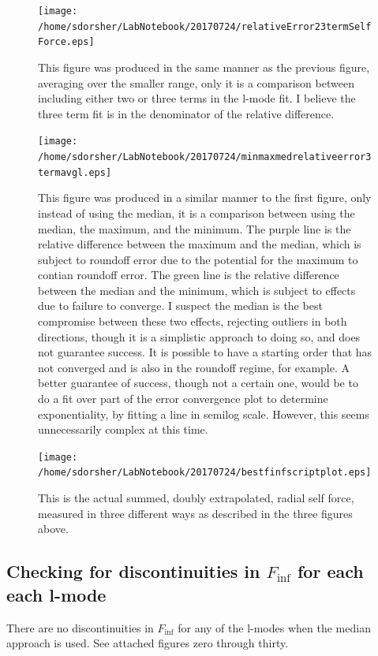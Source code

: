 \documentclass{article}
\begin{document}
\newpage

\begin{figure}
  \texttt{[image: /home/sdorsher/LabNotebook/20170724/relativeError23termSelfForce.eps]}
  \caption{This figure was produced in the same manner as the previous figure, averaging over the smaller range, only it is a comparison between including either two or three terms in the l-mode fit. I believe the three term fit is in the denominator of the relative difference.}
\end{figure}

\begin{figure}
  \texttt{[image: /home/sdorsher/LabNotebook/20170724/minmaxmedrelativeerror3termavgl.eps]}
  \caption{This figure was produced in a similar manner to the first figure, only instead of using the median, it is a comparison between using the median, the maximum, and the minimum. The purple line is the relative difference between the maximum and the median, which is subject to roundoff error due to the potential for the maximum to contian roundoff error. The green line is the relative difference between the median and the minimum, which is subject to effects due to failure to converge. I suspect the median is the best compromise between these two effects, rejecting outliers in both directions, though it is a simplistic approach to doing so, and does not guarantee success. It is possible to have a starting order that has not converged and is also in the roundoff regime, for example. A better guarantee of success, though not a certain one, would be to do a fit over part of the error convergence plot to determine exponentiality, by fitting a line in semilog scale. However, this seems unnecessarily complex at this time.}
\end{figure}
  
\begin{figure}
  \texttt{[image: /home/sdorsher/LabNotebook/20170724/bestfinfscriptplot.eps]}
  \caption{This is the actual summed, doubly extrapolated, radial self force, measured in three different ways as described in the three figures above.}
\end{figure}



\subsection{ Checking for discontinuities in $F_{\inf}$ for each each l-mode}

There are no discontinuities in $F_{\inf}$ for any of the l-modes when the median approach is used. See attached figures zero through thirty.
\end{document}
